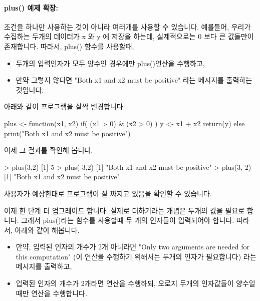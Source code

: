 \paragraph{plus() 예제 확장: }

조건을 하나만 사용하는 것이 아니라 여러개를 사용할 수 있습니다. 
예를들어, 우리가 수집하는 두개의 데이터가 x 와  y 에 저장을 하는데, 실제적으로는 0 보다 큰 값들만이 존재합니다. 
따라서, plus() 함수를 사용할때,  

\begin{itemize}
\item 두개의 입력인자가 모두 양수인 경우에만 plus()연산을 수행하고,
\item 만약 그렇지 않다면 "Both x1 and x2 must be positive" 라는 메시지를 출력하는 것입니다.
\end{itemize}

아래와 같이 프로그램을 살짝 변경합니다. 

\begin{Schunk}
\begin{Soutput}
plus <- function(x1, x2){
	if( (x1 > 0) & (x2 > 0) ){
		y <- x1 + x2
		return(y)
	}
	else print("Both x1 and x2 must be positive")
}
\end{Soutput}
\end{Schunk}

이제 그 결과를 확인해 봅니다. 

\begin{Schunk}
\begin{Soutput}
> plus(3,2)
[1] 5
> plus(-3,2)
[1] "Both x1 and x2 must be positive"
> plus(3,-2)
[1] "Both x1 and x2 must be positive"
\end{Soutput}
\end{Schunk}

사용자가 예상한대로 프로그램이 잘 짜지고 있음을 확인할 수 있습니다. 

이제 한 단계 더 업그레이드 합니다. 
실제로 더하기라는 개념은 두개의 값을 필요로 합니다. 
그래서 plus()라는 함수를 사용할때 두 개의 인자들이 입력되어야 합니다.
따라서, 아래와 같이 해봅니다.

\begin{itemize}
\item 만약, 입력된 인자의 개수가 2개 아니라면 "Only two arguments are needed for this computation" (이 연산을 수행하기 위해서는 두개의 인자가 필요합니다) 라는 메시지를 출력하고, 
\item 입력된 인자의 개수가 2개라면 연산을 수행하되, 오로지 두개의 인자값들이 양수일때만 연산을 수행합니다. 
\end{itemize}

